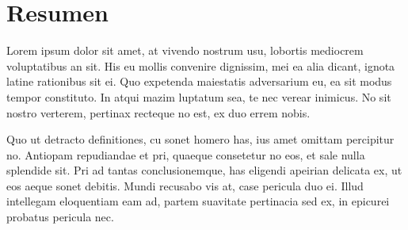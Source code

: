 \section*{Resumen}
    Lorem ipsum dolor sit amet, at vivendo nostrum usu, lobortis mediocrem voluptatibus an sit.
    His eu mollis convenire dignissim, mei ea alia dicant, ignota latine rationibus sit ei. Quo
    expetenda maiestatis adversarium eu, ea sit modus tempor constituto. In atqui mazim luptatum
    sea, te nec verear inimicus. No sit nostro verterem, pertinax recteque no est, ex duo errem nobis.
    
    Quo ut detracto definitiones, cu sonet homero has, ius amet omittam percipitur no. Antiopam
    repudiandae et pri, quaeque consetetur no eos, et sale nulla splendide sit. Pri ad tantas
    conclusionemque, has eligendi apeirian delicata ex, ut eos aeque sonet debitis. Mundi recusabo
    vis at, case pericula duo ei. Illud intellegam eloquentiam eam ad, partem suavitate pertinacia sed
    ex, in epicurei probatus pericula nec.
    